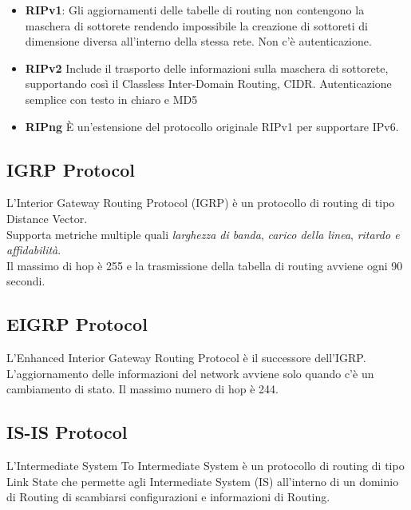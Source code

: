 \documentclass[a4paper]{article}
\begin{document}
\begin{itemize}
    \item \textbf{RIPv1}: Gli aggiornamenti delle tabelle di routing non contengono
        la maschera di sottorete rendendo impossibile la creazione di sottoreti di dimensione
        diversa all'interno della stessa rete. Non c'è autenticazione.

    \item \textbf{RIPv2} Include il trasporto delle informazioni sulla maschera
        di sottorete, supportando così il Classless Inter-Domain Routing, CIDR.
        Autenticazione semplice con testo in chiaro e MD5
    \item \textbf{RIPng} È un'estensione del protocollo originale RIPv1 per supportare IPv6.
\end{itemize}

\pagebreak

\subsection{IGRP Protocol}

L'Interior Gateway Routing Protocol (IGRP) è un protocollo di routing di tipo Distance Vector.
\\
Supporta metriche multiple quali \textit{larghezza di banda}, \textit{carico della linea},
\textit{ritardo e affidabilità}.
\\
Il massimo di hop è 255 e la trasmissione della tabella di routing avviene ogni 90 secondi.

\subsection{EIGRP Protocol}

L'Enhanced Interior Gateway Routing Protocol è il successore dell'IGRP.
\\
L'aggiornamento delle informazioni del network avviene solo quando c'è un cambiamento di stato.
Il massimo numero di hop è 244.

\subsection{IS-IS Protocol}

L'Intermediate System To Intermediate System è un protocollo di routing di tipo Link
State che permette agli Intermediate System (IS) all'interno di un dominio di Routing di scambiarsi
configurazioni e informazioni di Routing.
\end{document}
